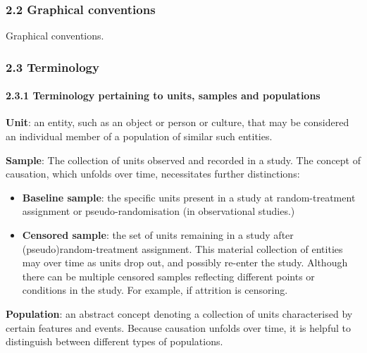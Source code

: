 \documentclass[
  singlecolumn]{article}
\let\oldparagraph\paragraph
\renewcommand{\paragraph}[1]{\oldparagraph{#1}\mbox{}}
\begin{document}
\subsubsection{2.2 Graphical conventions}\label{graphical-conventions}

\begin{table}

\caption{\label{tbl-conventionsgraph}Graphical conventions.}

\centering{

\terminologylocalconventions 

}

\end{table}%

\subsubsection{2.3 Terminology}\label{terminology}

\paragraph{2.3.1 Terminology pertaining to units, samples and
populations}\label{terminology-pertaining-to-units-samples-and-populations}

\textbf{Unit}: an entity, such as an object or person or culture, that
may be considered an individual member of a population of similar such
entities.

\textbf{Sample}: The collection of units observed and recorded in a
study. The concept of causation, which unfolds over time, necessitates
further distinctions:

\begin{itemize}
\item
  \textbf{Baseline sample}: the specific units present in a study at
  random-treatment assignment or pseudo-randomisation (in observational
  studies.)
\item
  \textbf{Censored sample}: the set of units remaining in a study after
  (pseudo)random-treatment assignment. This material collection of
  entities may over time as units drop out, and possibly re-enter the
  study. Although there can be multiple censored samples reflecting
  different points or conditions in the study. For example, if attrition
  is censoring.
\end{itemize}

\textbf{Population}: an abstract concept denoting a collection of units
characterised by certain features and events. Because causation unfolds
over time, it is helpful to distinguish between different types of
populations.
\end{document}
